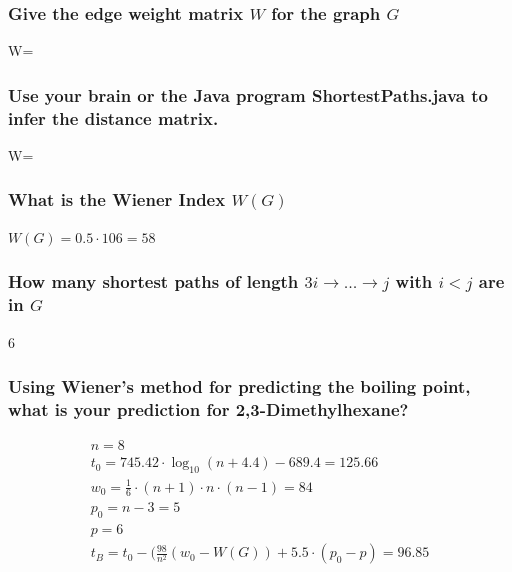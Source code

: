 \documentclass[12pt, a4paper]{article}
\begin{document}
		\subsubsection{Give the edge weight matrix $W$ for the graph $G$}
			W=
		\subsubsection{Use your brain or the Java program ShortestPaths.java to infer the distance matrix. }
	W=
		\subsubsection{What is the Wiener Index $W(G)$}
			$W(G)= 0.5\cdot 106=58$
		\subsubsection{How many shortest paths of length $3 i \rightarrow ...\rightarrow j$ with $i<j$ are in $G$}
			6
		\subsubsection{Using Wiener’s method for predicting the boiling point, what is your prediction for 2,3-Dimethylhexane?}
			\begin{align*}
				n= 8\\
				t_0=745.42\cdot\log_{10}(n+4.4)-689.4=125.66\\
				w_0=\frac{1}{6}\cdot(n+1)\cdot n \cdot (n-1) = 84\\
				p_0=n-3=5\\
				p=6\\
				t_B=t_0-(\frac{98}{n^2}(w_0-W(G))+5.5\cdot(p_0-p)=96.85
			\end{align*}
\end{document}
